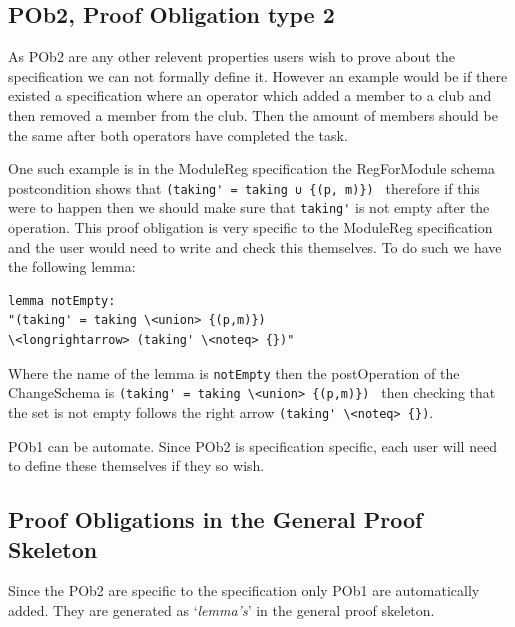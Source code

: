 \subsection{POb2, Proof Obligation type 2}

As POb2 are any other relevent properties users wish to prove about the specification we can not formally define it. However an example would be if there existed a specification where an operator which added a member to a club and then removed a member from the club. Then the amount of members should be the same after both operators have completed the task.

One such example is in the ModuleReg specification the RegForModule schema postcondition shows that \verb|(taking' = taking ∪ {(p, m)}) | therefore if this were to happen then we should make sure that \verb|taking'| is not empty after the operation. This proof obligation is very specific to the ModuleReg specification and the user would need to write and check this themselves. To do such we have the following lemma:

\begin{verbatim}
lemma notEmpty:
"(taking' = taking \<union> {(p,m)}) 
\<longrightarrow> (taking' \<noteq> {})"
\end{verbatim}

Where the name of the lemma is \verb|notEmpty| then the postOperation of the ChangeSchema is \verb|(taking' = taking \<union> {(p,m)}) | then checking that the set is not empty follows the right arrow \verb|(taking' \<noteq> {})|.

POb1 can be automate. Since POb2 is specification specific, each user will need to define these themselves if they so wish.

\subsection{Proof Obligations in the General Proof Skeleton}

Since the POb2 are specific to the specification only POb1 are automatically added. They are generated as `\emph{lemma's}' in the general proof skeleton. 


